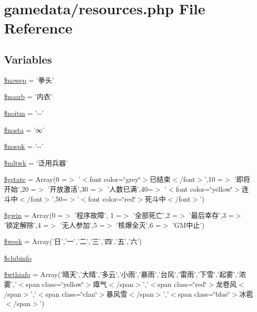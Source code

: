 \hypertarget{resources_8php}{\section{gamedata/resources.php File Reference}
\label{resources_8php}
}
\subsection*{Variables}
\begin{DoxyCompactItemize}
\item 
\hyperlink{resources_8php_a413d4ee11837afa83d33b1cd34244911}{\$nowep} = '拳头'
\item 
\hyperlink{resources_8php_a7042f4c981c7c1dd023648a96ee9a456}{\$noarb} = '内衣'
\item 
\hyperlink{resources_8php_ad51c71e4cc6cd78c709454b5f2a2f84c}{\$noitm} = '-\/-\/'
\item 
\hyperlink{resources_8php_a1b178dce2c8c7c1f35b20c828d51de4a}{\$nosta} = '∞'
\item 
\hyperlink{resources_8php_a472cdfe07d9d5ca35696f2aa6848fd0c}{\$nospk} = '-\/-\/'
\item 
\hyperlink{resources_8php_af12f55cfe5805f1081499f04e700478a}{\$mltwk} = '泛用兵器'
\item 
\hyperlink{resources_8php_a5aed3a3ce44a1f7125854d31c7f61a6b}{\$gstate} = Array(0 =$>$ '$<$font color=\char`\"{}grey\char`\"{}$>$已结束$<$/font$>$',10 =$>$ '即将开始',20 =$>$ '开放激活',30 =$>$ '人数已满',40=$>$ '$<$font color=\char`\"{}yellow\char`\"{}$>$连斗中$<$/font$>$',50=$>$'$<$font color=\char`\"{}red\char`\"{}$>$死斗中$<$/font$>$')
\item 
\hyperlink{resources_8php_a2957a034129d3598a5d35640b8906532}{\$gwin} = Array(0 =$>$ '程序故障', 1 =$>$ '全部死亡',2 =$>$ '最后幸存',3 =$>$ '锁定解除',4 =$>$ '无人参加',5 =$>$ '核爆全灭',6 =$>$ 'G\+M中止')
\item 
\hyperlink{resources_8php_ad51e8a8cd3d4faaf3cb8e8b75dea029f}{\$week} = Array('日','一','二','三','四','五','六')
\item 
\hyperlink{resources_8php_a8b3df41376c3d0f32c94cad94b494ce0}{\$clubinfo}
\item 
\hyperlink{resources_8php_a42c20343a70aaec3fcdbace0179e4eb2}{\$wthinfo} = Array('晴天','大晴','多云','小雨','暴雨','台风','雷雨','下雪','起雾','浓雾','$<$span class=\char`\"{}yellow\char`\"{}$>$瘴气$<$/span$>$','$<$span class=\char`\"{}red\char`\"{}$>$龙卷风$<$/span$>$','$<$span class=\char`\"{}clan\char`\"{}$>$暴风雪$<$/span$>$','$<$span class=\char`\"{}blue\char`\"{}$>$冰雹$<$/span$>$')

\end{DoxyCompactItemize}
